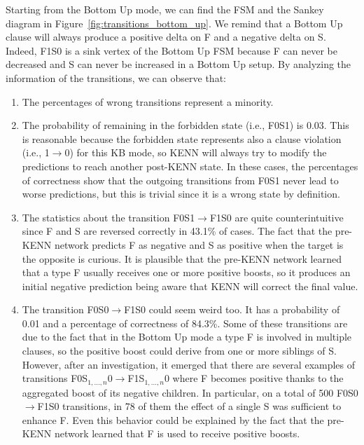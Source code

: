 Starting from the Bottom Up mode, we can find the FSM and the Sankey diagram in Figure~\ref{fig:transitions_bottom_up}. We remind that a Bottom Up clause will always produce a positive delta on F and a negative delta on S. Indeed, F1S0 is a sink vertex of the Bottom Up FSM because F can never be decreased and S can never be increased in a Bottom Up setup. By analyzing the information of the transitions, we can observe that:
\begin{enumerate}
    \item The percentages of wrong transitions represent a minority.
    \item The probability of remaining in the forbidden state (i.e., F0S1) is 0.03. This is reasonable because the forbidden state represents also a clause violation (i.e., 1$\to$0) for this KB mode, so KENN will always try to modify the predictions to reach another post-KENN state. In these cases, the percentages of correctness show that the outgoing transitions from F0S1 never lead to worse predictions, but this is trivial since it is a wrong state by definition.
    \item The statistics about the transition F0S1$\to$F1S0 are quite counterintuitive since F and S are reversed correctly in 43.1\% of cases. The fact that the pre-KENN network predicts F as negative and S as positive when the target is the opposite is curious. It is plausible that the pre-KENN network learned that a type F usually receives one or more positive boosts, so it produces an initial negative prediction being aware that KENN will correct the final value. 
    \item The transition F0S0$\to$F1S0 could seem weird too. It has a probability of 0.01 and a percentage of correctness of 84.3\%. Some of these transitions are due to the fact that in the Bottom Up mode a type F is involved in multiple clauses, so the positive boost could derive from one or more siblings of S. However, after an investigation, it emerged that there are several examples of transitions F0S$_{1,...,n}$0$\to$F1S$_{1,...,n}$0 where F becomes positive thanks to the aggregated boost of its negative children. In particular, on a total of 500 F0S0$\to$F1S0 transitions, in 78 of them the effect of a single S was sufficient to enhance F. Even this behavior could be explained by the fact that the pre-KENN network learned that F is used to receive positive boosts.
\end{enumerate}


